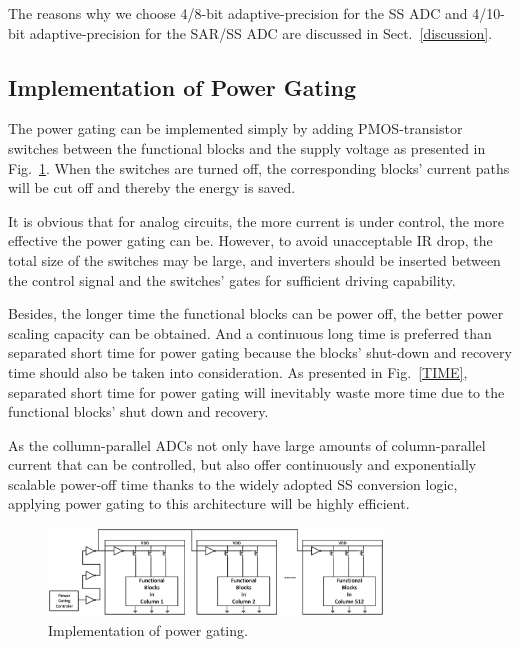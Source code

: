 The reasons why we choose 4/8-bit adaptive-precision for the SS ADC and 4/10-bit adaptive-precision for the SAR/SS ADC are discussed in Sect.~\ref{discussion}.


\subsection{Implementation of Power Gating}

The power gating can be implemented simply by adding PMOS-transistor switches between the functional blocks and the supply voltage \cite{keating_low_2007} as presented in Fig.~\ref{GATING}. 
When the switches are turned off, the corresponding blocks’ current paths will be cut off and thereby the energy is saved. 

It is obvious that for analog circuits, the more current is under control, the more effective the power gating can be. However, to avoid unacceptable IR drop, the total size of the switches may be large, 
and inverters should be inserted between the control signal and the switches’ gates for sufficient driving capability. 

Besides, the longer time the functional blocks can be power off, the better power scaling capacity can be obtained. And a continuous long time is preferred than separated short time for power gating because the blocks' shut-down and recovery time should also be taken into consideration.
As presented in Fig.~\ref{TIME}, separated short time for power gating will inevitably waste more
time due to the functional blocks' shut down and recovery. 

As the collumn-parallel ADCs not only have large amounts of column-parallel current that can be controlled, but also offer continuously and exponentially scalable power-off time thanks to the widely adopted SS conversion logic, applying power gating to this architecture will be highly efficient.

\begin{figure}[htbp]
	\centerline{\includegraphics[width=3.5in]{./Figures/GATING.eps}}
	\caption{Implementation of power gating.}
	\label{GATING}
\end{figure} 

